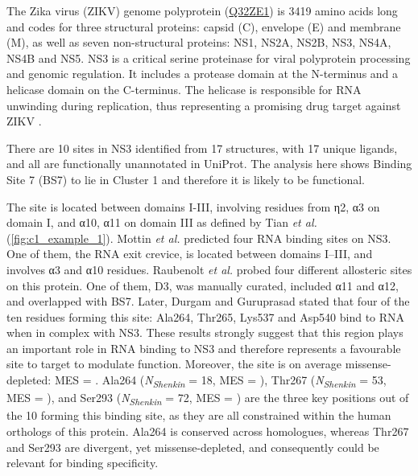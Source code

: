 {The Zika virus (ZIKV) genome polyprotein (\href{https://www.uniprot.org/uniprotkb/Q32ZE1/entry}{Q32ZE1}) is 3419 amino acids long and codes for three structural proteins: capsid (C), envelope (E) and membrane (M), as well as seven non-structural proteins: NS1, NS2A, NS2B, NS3, NS4A, NS4B and NS5. NS3 is a critical serine proteinase for viral polyprotein processing and genomic regulation. It includes a protease domain at the N-terminus and a helicase domain on the C-terminus. The helicase is responsible for RNA unwinding during replication, thus representing a promising drug target against ZIKV \cite{LUO_2015_FLAVIVIRUS}.

There are 10 sites in NS3 identified from 17 structures, with 17 unique ligands, and all are functionally unannotated in UniProt. The analysis here shows Binding Site 7 (BS7) to lie in Cluster 1 and therefore it is likely to be functional.

The site is located between domains I-III, involving residues from η2, α3 on domain I, and α10, α11 on domain III as defined by Tian \textit{et al.} \cite{TIAN_2016_ZIKV} (\autoref{fig:c1_example_1}). Mottin \textit{et al.} \cite{MOTTIN_2017_ZIKA_HELICASE} predicted four RNA binding sites on NS3. One of them, the RNA exit crevice, is located between domains I–III, and involves α3 and α10 residues. Raubenolt \textit{et al.} \cite{RAUBENOLT_2021_ZIKA_ALLOSTERIC} probed four different allosteric sites on this protein. One of them, D3, was manually curated, included α11 and α12, and overlapped with BS7. Later, Durgam and Guruprasad \cite{DURGAM_2022_ZIKA_ATP} stated that four of the ten residues forming this site: Ala264, Thr265, Lys537 and Asp540 bind to RNA when in complex with NS3. These results strongly suggest that this region plays an important role in RNA binding to NS3 and therefore represents a favourable site to target to modulate function. Moreover, the site is on average missense-depleted: MES =  . Ala264 (\textit{N\textsubscript{Shenkin}} = 18, MES = ), Thr267 (\textit{N\textsubscript{Shenkin}} = 53, MES = ), and Ser293 (\textit{N\textsubscript{Shenkin}} = 72, MES =  ) are the three key positions out of the 10 forming this binding site, as they are all constrained within the human orthologs of this protein. Ala264 is conserved across homologues, whereas Thr267 and Ser293 are divergent, yet missense-depleted, and consequently could be relevant for binding specificity.

}
